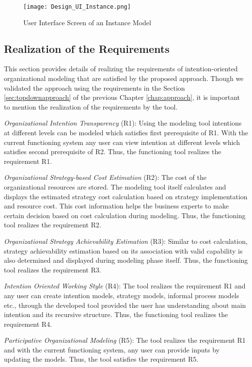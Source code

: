 \begin{figure} [H]
	\centering
	\texttt{[image: Design\_UI\_Instance.png]}
	\caption{User Interface Screen of an Instance Model}
	\label{fig:realizationofinstances}
\end{figure}

\subsection{Realization of the Requirements}
\label{sec:validation}
This section provides details of realizing the requirements of intention-oriented organizational modeling that are satisfied by the proposed approach. Though we validated the approach using the requirements in the Section \ref{sec:topdownapproach} of the previous Chapter \ref{chap:approach}, it is important to mention the realization of the requirements by the tool.

\textit{Organizational Intention Transparency} (R1):  Using the modeling tool intentions at different levels can be modeled which satisfies first prerequisite of R1. With the current functioning system any user can view intention at different levels which satisfies second prerequisite of R2. Thus, the functioning tool realizes the requirement R1.

\textit{Organizational Strategy-based Cost Estimation} (R2): The cost of the organizational resources are stored. The modeling tool itself calculates and displays the estimated strategy cost calculation based on strategy implementation and resource cost. This cost information helps the business experts to make certain decision based on cost calculation during modeling. Thus, the functioning tool realizes the requirement R2.  

\textit{Organizational Strategy Achievability Estimation} (R3): Similar to cost calculation, strategy achievability estimation based on its association with valid capability is also determined and displayed during modeling phase itself. Thus, the functioning tool realizes the requirement R3.

\textit{Intention Oriented Working Style} (R4): The tool realizes the requirement R1 and any user can create intention models, strategy models, informal process models etc., through the developed tool provided the user has understanding about main intention and its recursive structure. Thus, the functioning tool realizes the requirement R4.

\textit{Participative Organizational Modeling} (R5): The tool realizes the requirement R1 and with the current functioning system, any user can provide inputs by updating the models. Thus, the tool satisfies the requirement R5.
		

